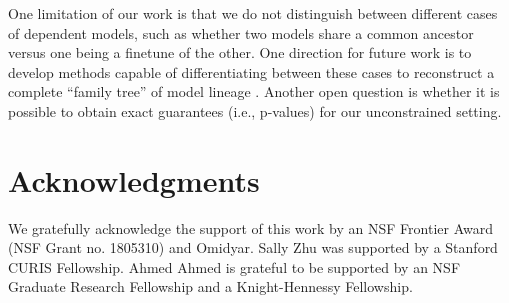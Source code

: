 One limitation of our work is that we do not distinguish between different cases of dependent models, such as whether two models share a common ancestor versus one being a finetune of the other.
One direction for future work is to develop methods capable of differentiating between these cases to reconstruct a complete ``family tree'' of model lineage \citep{yax2024phylolminferringphylogeny}.
Another open question is whether it is possible to obtain exact guarantees (i.e., p-values) for our unconstrained setting.

\newpage 

\section*{Acknowledgments}
We gratefully acknowledge the support of this work by an NSF Frontier Award (NSF Grant no. 1805310) and Omidyar. Sally Zhu was supported by a Stanford CURIS Fellowship. Ahmed Ahmed is grateful to be supported by an NSF Graduate Research Fellowship and a Knight-Hennessy Fellowship.